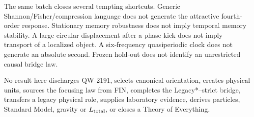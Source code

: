 \documentclass[11pt,a4paper]{article}
\begin{document}
The same batch closes several tempting shortcuts. Generic Shannon/Fisher/compression language does not generate the attractive fourth-order response. Stationary memory robustness does not imply temporal memory stability. A large circular displacement after a phase kick does not imply transport of a localized object. A six-frequency quasiperiodic clock does not generate an absolute second. Frozen hold-out does not identify an unrestricted causal bridge law.

No result here discharges QW-2191, selects canonical orientation, creates physical units, sources the focusing law from FIN, completes the Legacy*--strict bridge, transfers a legacy physical role, supplies laboratory evidence, derives particles, Standard Model, gravity or $L_{\rm total}$, or closes a Theory of Everything.
\end{document}
